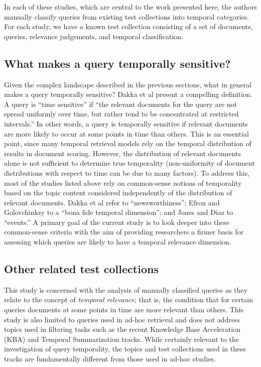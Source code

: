 \documentclass{sig-alternate}
\begin{document}
In each of these studies, which are central to the work presented here, the authors manually classify queries from existing test collections into temporal categories. For each study, we have a known test collection consisting of a set of documents, queries, relevance judgements, and temporal classification.  


\subsection{What makes a query temporally sensitive?}

Given the complex landscape described in the previous sections, what in general makes a query temporally sensitive? Dakka et al \cite{Dakka2012} present a compelling definition. A query is ``time sensitive''  if  ``the relevant documents for the query are not spread uniformly over time, but rather tend to be concentrated at restricted intervals.''  In other words, a query is temporally sensitive if relevant documents are more likely to occur at some points in time than others. This is an essential point, since many temporal retrieval models rely on the temporal distribution of results in document scoring. However, the distribution of relevant documents alone is not sufficient to determine true temporality (non-uniformity of document distributions with respect to time can be due to many factors). To address this, most of the studies listed above rely on common-sense notions of temporality based on the topic content considered independently of the distribution of relevant documents. Dakka et al refer to ``newsworthiness''; Efron and Golovchinksy to a ``bona fide temporal dimension''; and Jones and Diaz to ``events.''  A primary goal of the current study is to look deeper into these common-sense criteria with the aim of providing researchers a firmer basis for assessing which queries are likely to have a temporal relevance dimension.


\subsection{Other related test collections}

This study is concerned with the analysis of manually classified queries as they relate to the concept of \emph{temporal relevance}; that is, the condition that for certain queries documents at some points in time are more relevant than others. This study is also limited to queries used in ad-hoc retrieval and does not address topics used in  filtering tasks such as the recent Knowledge Base Acceleration (KBA) \cite{Frank2013} and Temporal Summarization \cite{Guo2013} tracks.  While certainly relevant to the investigation of query temporality, the topics and test collections used in these tracks are fundamentally different from those used in ad-hoc studies. 
\end{document}
